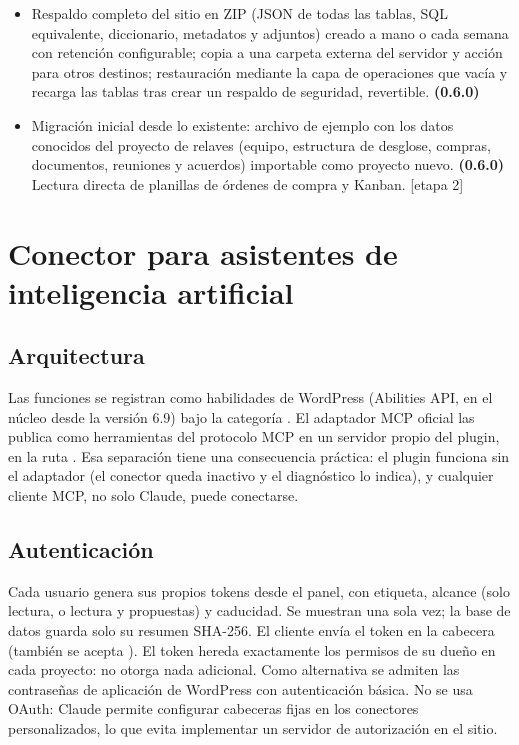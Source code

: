 \documentclass[11pt,a4paper]{article}
\newcommand{\etapa}[1]{\textcolor{grismedio}{[etapa #1]}}
\begin{document}
\begin{itemize}
\item Respaldo completo del sitio en ZIP (JSON de todas las tablas, SQL equivalente, diccionario, metadatos y adjuntos) creado a mano o cada semana con retención configurable; copia a una carpeta externa del servidor y acción  para otros destinos; restauración mediante la capa de operaciones que vacía y recarga las tablas tras crear un respaldo de seguridad, revertible. \textbf{(0.6.0)}
\item Migración inicial desde lo existente: archivo de ejemplo con los datos conocidos del proyecto de relaves (equipo, estructura de desglose, compras, documentos, reuniones y acuerdos) importable como proyecto nuevo. \textbf{(0.6.0)} Lectura directa de planillas de órdenes de compra y Kanban. \etapa{2}
\end{itemize}

\section{Conector para asistentes de inteligencia artificial}

\subsection{Arquitectura}

Las funciones se registran como habilidades de WordPress (Abilities API, en el núcleo desde la versión 6.9) bajo la categoría . El adaptador MCP oficial las publica como herramientas del protocolo MCP en un servidor propio del plugin, en la ruta . Esa separación tiene una consecuencia práctica: el plugin funciona sin el adaptador (el conector queda inactivo y el diagnóstico lo indica), y cualquier cliente MCP, no solo Claude, puede conectarse.

\subsection{Autenticación}

Cada usuario genera sus propios tokens desde el panel, con etiqueta, alcance (solo lectura, o lectura y propuestas) y caducidad. Se muestran una sola vez; la base de datos guarda solo su resumen SHA-256. El cliente envía el token en la cabecera  (también se acepta ). El token hereda exactamente los permisos de su dueño en cada proyecto: no otorga nada adicional. Como alternativa se admiten las contraseñas de aplicación de WordPress con autenticación básica. No se usa OAuth: Claude permite configurar cabeceras fijas en los conectores personalizados, lo que evita implementar un servidor de autorización en el sitio.
\end{document}
